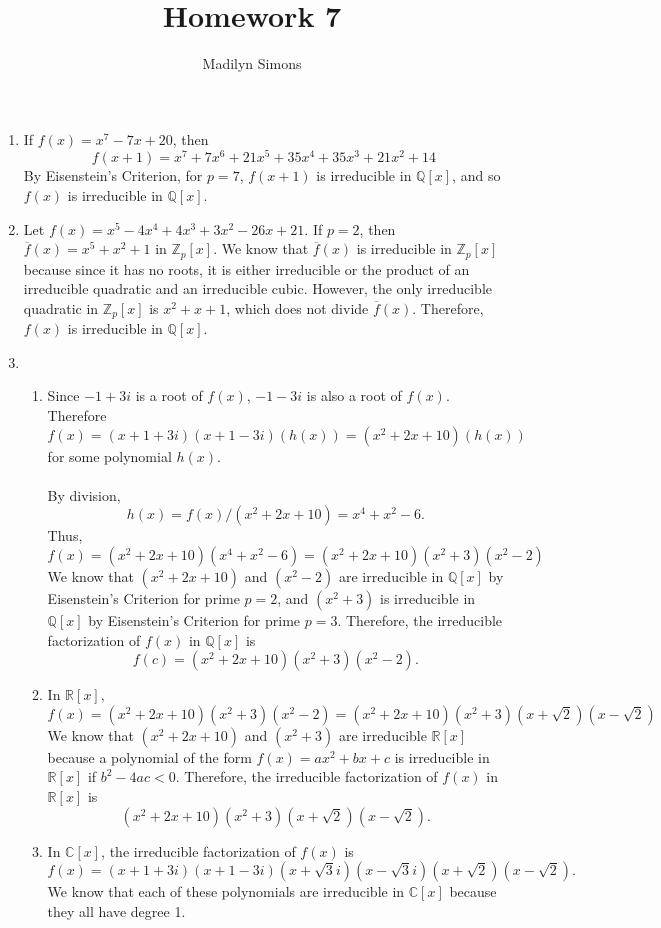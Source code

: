 \documentclass{article}
\title{Homework 7}
\author{Madilyn Simons}
\date{}
\begin{document}
\maketitle

\begin{enumerate}

\item If $f(x) = x^7 - 7x + 20$, then
\[
f(x+1) = x^7 + 7x^6 + 21x^5 + 35x^4 + 35x^3 + 21x^2 + 14
\]
By Eisenstein's Criterion, for $p = 7$, $f(x + 1)$ is irreducible in $\mathbb{Q}[x]$,
and so $f(x)$ is irreducible in $\mathbb{Q}[x]$.

\item Let $f(x) = x^5 - 4x^4 + 4x^3 + 3x^2 -26x + 21$.
If $p = 2$, then $\overline{f}(x) = x^5 + x^2 + 1$ in $\mathbb{Z}_{p}[x]$.
We know that $\overline{f}(x)$ is irreducible in $\mathbb{Z}_{p}[x]$ because
since it has no roots, it is either irreducible or the product of an irreducible
quadratic and an irreducible cubic.  However, the only irreducible quadratic
in $\mathbb{Z}_{p}[x]$ is $x^2 + x + 1$, which does not divide $\overline{f}(x)$.
Therefore, $f(x)$ is irreducible in $\mathbb{Q}[x]$.

\item
\begin{enumerate}
\item
Since $-1 + 3i$ is a root of $f(x)$, $-1 - 3i$ is also a root of $f(x)$.
Therefore
\[
f(x) = (x + 1 + 3i)(x + 1 - 3i)(h(x)) = (x^2 + 2x + 10)(h(x))
\] for
some polynomial $h(x)$.
\\ \\
By division,
\[h(x) = f(x) / (x^2 + 2x + 10) = x^4 + x^2 - 6.
\]
Thus,
\[f(x) = (x^2 + 2x + 10)(x^4 + x^2 - 6) = (x^2 + 2x + 10)(x^2 + 3)(x^2 - 2)
\]
We know that $(x^2 + 2x + 10)$ and $(x^2 - 2)$ are irreducible in $\mathbb{Q}[x]$
by Eisenstein's Criterion for prime $p = 2$, and $(x^2 + 3)$ is irreducible
in $\mathbb{Q}[x]$ by Eisenstein's Criterion for prime $p = 3$.
Therefore, the irreducible
factorization of $f(x)$ in $\mathbb{Q}[x]$ is
\[
f(c) = (x^2 + 2x + 10)(x^2 + 3)(x^2 - 2).
\]

\item
In $\mathbb{R}[x]$,
\[f(x) = (x^2 + 2x + 10)(x^2 + 3)(x^2 - 2)
= (x^2 + 2x + 10)(x^2 + 3)(x + \sqrt{2})(x - \sqrt{2})
\]
We know that $(x^2 + 2x + 10)$ and $(x^2 + 3)$ are irreducible $\mathbb{R}[x]$
because a polynomial of the form $f(x) = ax^2 + bx + c$ is irreducible in
$\mathbb{R}[x]$ if $b^2 - 4ac < 0$.  Therefore, the irreducible factorization
of $f(x)$ in $\mathbb{R}[x]$ is
\[
(x^2 + 2x + 10)(x^2 + 3)(x + \sqrt{2})(x - \sqrt{2}).
\]

\item
In $\mathbb{C}[x]$, the irreducible factorization of $f(x)$ is
\[
f(x) = (x + 1 + 3i)(x + 1 - 3i)(x + \sqrt{3}i)(x - \sqrt{3}i)(x + \sqrt{2})(x - \sqrt{2}).
\]
We know that each of these polynomials are irreducible in $\mathbb{C}[x]$ because
they all have degree 1.

\end{enumerate}
\end{enumerate}
\end{document}

